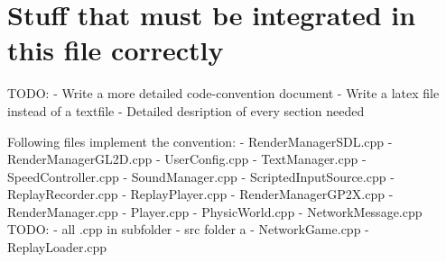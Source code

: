 \documentclass[a4paper]{scrartcl}
\begin{document}
\section{Stuff that must be integrated in this file correctly}
TODO:
- Write a more detailed code-convention document
- Write a latex file instead of a textfile
- Detailed desription of every section needed

Following files implement the convention:
- RenderManagerSDL.cpp
- RenderManagerGL2D.cpp
- UserConfig.cpp
- TextManager.cpp
- SpeedController.cpp
- SoundManager.cpp
- ScriptedInputSource.cpp
- ReplayRecorder.cpp
- ReplayPlayer.cpp
- RenderManagerGP2X.cpp
- RenderManager.cpp
- Player.cpp
- PhysicWorld.cpp
- NetworkMessage.cpp
TODO:
- all .cpp in subfolder
- src folder a - NetworkGame.cpp
- ReplayLoader.cpp
\end{document}
